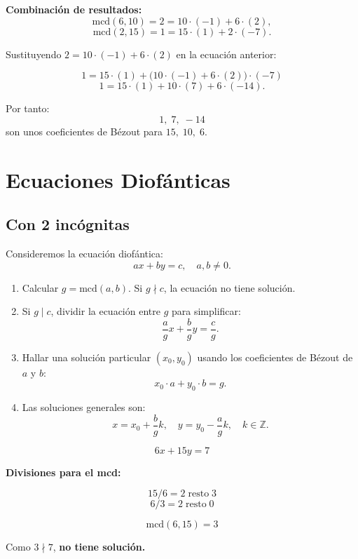 \documentclass[a4paper,12pt]{article}
\begin{document}
\begin{tcolorbox}[colback=blue!5!white, colframe=blue!60!black, title=\textbf{Cálculo de \(\text{mcd}(6,10,15)\)}]
\textbf{Combinación de resultados:}
\[
\text{mcd}(6,10) = \boxed{2} = 10 \cdot (-1) + 6 \cdot (2),
\]
\[
\text{mcd}(2,15) = \boxed{1} = 15 \cdot (1) + 2 \cdot (-7).
\]

Sustituyendo \(2 = 10\cdot(-1) + 6\cdot(2)\) en la ecuación anterior:

\[
1 = 15 \cdot (1) + \big(10\cdot(-1) + 6\cdot(2)\big)\cdot(-7)
\]
\[
1 = 15\cdot(1) + 10\cdot(7) + 6\cdot(-14).
\]

Por tanto:
\[
1,\; 7,\; -14
\]
son unos coeficientes de Bézout para \(15,\;10,\;6\).
\end{tcolorbox}

\section{Ecuaciones Diofánticas}

\subsection{Con 2 incógnitas}

\begin{procedimiento}
Consideremos la ecuación diofántica:
\[
a x + b y = c, \quad a,b \neq 0.
\]

\begin{enumerate}
    \item Calcular \(g = \text{mcd}(a,b)\). Si \(g \nmid c\), la ecuación no tiene solución.
    \item Si \(g \mid c\), dividir la ecuación entre \(g\) para simplificar:
    \[
    \frac{a}{g} x + \frac{b}{g} y = \frac{c}{g}.
    \]
    \item Hallar una solución particular \((x_0,y_0)\) usando los coeficientes de Bézout de \(a\) y \(b\):
    \[
    x_0 \cdot a + y_0 \cdot b = g.
    \]
    \item Las soluciones generales son:
    \[
    x = x_0 + \frac{b}{g} k, \quad y = y_0 - \frac{a}{g} k, \quad k \in \mathbb{Z}.
    \]
\end{enumerate}
\end{procedimiento}


\begin{ejemplo}[title={Ecuación sin solución}]
\[
6x + 15y = 7
\]

\textbf{Divisiones para el mcd:}

\[
15 / 6 = 2 \;\text{resto}\; \boxed{3}
\]
\[
6 / 3 = 2 \;\text{resto}\; 0
\]

\[
\text{mcd}(6,15) = \boxed{3}
\]

Como \(3 \nmid 7\), \textbf{no tiene solución.}
\end{ejemplo}
\end{document}
